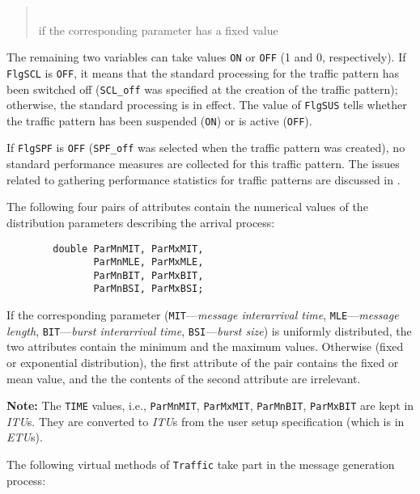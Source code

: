 \begin{quote}
\noindent{}\\ \hspace{0in}
if the corresponding parameter has a fixed value
\end{quote}\medskip

The remaining two variables can take values {\tt ON} or {\tt OFF} (1 and 0,
respectively).
If {\tt FlgSCL} is {\tt OFF}, it means that the standard processing for
the traffic pattern has been switched off ({\tt SCL\_off} was specified
at the creation of the traffic pattern); otherwise, the standard processing
is in effect.
The value of
{\tt FlgSUS} tells whether the traffic pattern has been suspended ({\tt ON})
or is active ({\tt OFF}).

If {\tt FlgSPF} is {\tt OFF} ({\tt SPF\_off} was selected
when the traffic pattern was created), no standard performance measures are
collected for this traffic pattern.
The issues related to gathering performance statistics for traffic
patterns are discussed in .

The following four pairs of attributes contain the numerical
values of the distribution parameters describing the arrival process:
\begin{verbatim}
        double ParMnMIT, ParMxMIT,
               ParMnMLE, ParMxMLE,
               ParMnBIT, ParMxBIT,
               ParMnBSI, ParMxBSI;
\end{verbatim}

If the corresponding parameter
({\tt MIT}---{\em message interarrival time}, {\tt MLE}---{\em message length},
{\tt BIT}---{\em burst interarrival time}, {\tt BSI}---{\em burst
size\/})
is uniformly distributed, the two
attributes contain the minimum and the maximum values.
Otherwise (fixed or exponential distribution), the first attribute of the
pair contains the fixed or mean value, and the
the contents of the second attribute are irrelevant.

\medskip

\noindent
{\bf Note:}
The {\tt TIME} values, i.e., {\tt ParMnMIT}, {\tt ParMxMIT}, {\tt ParMnBIT},
{\tt ParMxBIT} are kept in {\em ITU\/}s.
They are converted to {\em ITU\/}s from the user setup specification (which is
in {\em ETU\/}s).

\medskip

The following virtual methods of {\tt Traffic} take part in the message
generation process:

